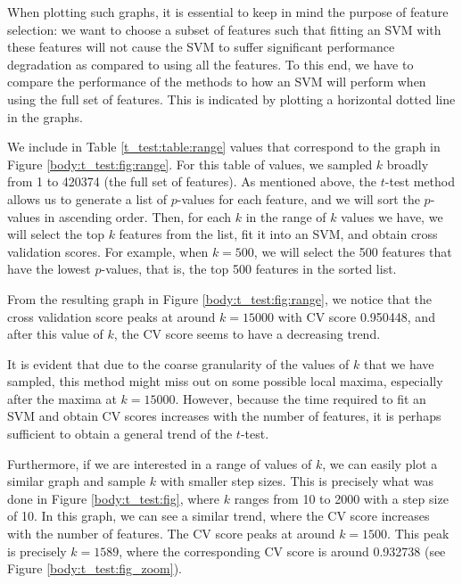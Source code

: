 \documentclass[12pt, twoside, a4paper]{report}
\begin{document}
When plotting such graphs, it is essential to keep in mind the purpose of feature selection: we want to choose a subset of features such that fitting an SVM with these features will not cause the SVM to suffer significant performance degradation as compared to using all the features. To this end, we have to compare the performance of the methods to how an SVM will perform when using the full set of features. This is indicated by plotting a horizontal dotted line in the graphs.

We include in Table \ref{t_test:table:range} values that correspond to the graph in Figure \ref{body:t_test:fig:range}. For this table of values, we sampled $k$ broadly from 1 to 420374 (the full set of features). As mentioned above, the $t$-test method allows us to generate a list of $p$-values for each feature, and we will sort the $p$-values in ascending order. Then, for each $k$ in the range of $k$ values we have, we will select the top $k$ features from the list, fit it into an SVM, and obtain cross validation scores. For example, when $k=500$, we will select the 500 features that have the lowest $p$-values, that is, the top 500 features in the sorted list.

From the resulting graph in Figure \ref{body:t_test:fig:range}, we notice that the cross validation score peaks at around $k=15000$ with CV score 0.950448, and after this value of $k$, the CV score seems to have a decreasing trend.

It is evident that due to the coarse granularity of the values of $k$ that we have sampled, this method might miss out on some possible local maxima, especially after the maxima at $k=15000$. However, because the time required to fit an SVM and obtain CV scores increases with the number of features, it is perhaps sufficient to obtain a general trend of the $t$-test.

Furthermore, if we are interested in a range of values of $k$, we can easily plot a similar graph and sample $k$ with smaller step sizes. This is precisely what was done in Figure \ref{body:t_test:fig}, where $k$ ranges from 10 to 2000 with a step size of 10. In this graph, we can see a similar trend, where the CV score increases with the number of features. The CV score peaks at around $k=1500$. This peak is precisely $k=1589$, where the corresponding CV score is around 0.932738 (see Figure \ref{body:t_test:fig_zoom}).

\end{document}
